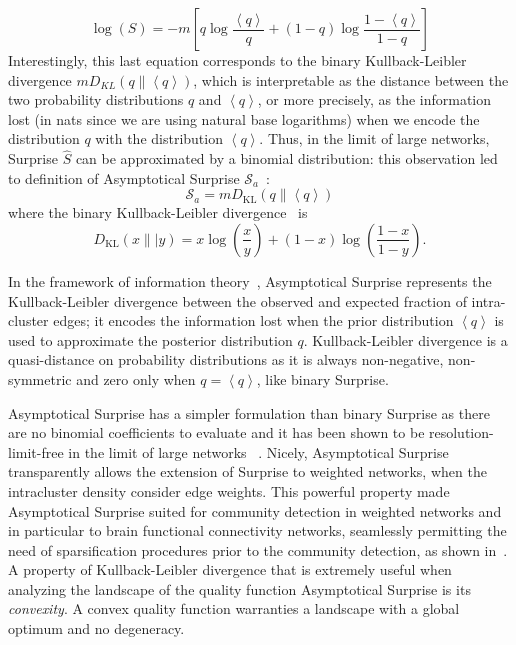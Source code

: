 \begin{equation}
\log(S) = -m \left[ q \log \frac{\left<q\right>}{q} + (1-q)\log \frac{1-\left<q\right>}{1-q} \right]
\end{equation}
Interestingly, this last equation corresponds to the binary Kullback-Leibler divergence $m D_{KL}(q \| \left< q \right>)$, which is interpretable as the distance between the two probability distributions $q$ and $\left<q\right>$, or more precisely, as the information lost (in nats since we are using natural base logarithms) when we encode the distribution $q$ with the distribution $\left< q\right>$. 
Thus, in the limit of large networks, Surprise $\hat{S}$ can be approximated by a binomial distribution: this observation led to definition of Asymptotical Surprise $\mathcal{S}_a$~\cite{traag2015}:
\begin{equation}\label{eq:asymptoticalsurprise}
\mathcal{S}_a = m D_{\textrm{KL}}\left( q \| \left< q \right> \right)
\end{equation}
where the binary Kullback-Leibler divergence~\cite{kullback1951} is $$D_{\textrm{KL}}(x\|| y) = x \log \left(\frac{x}{y} \right) + (1-x)\log \left (\frac{1-x}{1-y} \right).$$

In the framework of information theory~\cite{cover2006}, Asymptotical Surprise represents the Kullback-Leibler divergence between the observed and expected fraction of intra-cluster edges; it encodes the information lost when the prior distribution $\left <q \right >$ is used to approximate the posterior distribution $q$. Kullback-Leibler divergence is a quasi-distance on probability distributions as it is always non-negative, non-symmetric and zero only when $q=\left< q \right>$, like binary Surprise.

Asymptotical Surprise has a simpler formulation than binary Surprise as there are no binomial coefficients to evaluate and it has been shown to be resolution-limit-free in the limit of large networks ~\cite{traag2015}. Nicely, Asymptotical Surprise transparently allows the extension of Surprise to weighted networks, when the intracluster density consider edge weights. This powerful property made Asymptotical Surprise suited for community detection in weighted networks and in particular to brain functional connectivity networks, seamlessly permitting the need of sparsification procedures prior to the community detection, as shown in~\cite{nicolini2017}. A property of Kullback-Leibler divergence that is extremely useful when analyzing the landscape of the quality function Asymptotical Surprise is its \emph{convexity}. A convex quality function warranties a landscape with a global optimum and no degeneracy.

